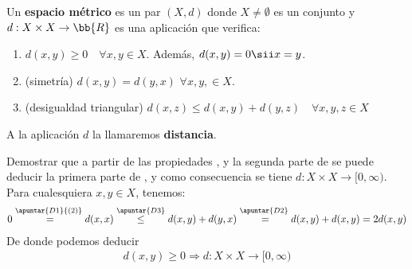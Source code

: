 \begin{definicion}
    Un \textbf{espacio métrico} es un par $(X, d)$ donde $X \neq \emptyset$ es un conjunto y $d: X \times X \rightarrow \bb{R}$ es una aplicación que verifica:

    \begin{enumerate}
        \item [\objetivo{D1}] $d(x, y) \geq 0$\ \ $\forall x,y \in X$. Además, $d(x,y)= 0 \sii x=y$.
        \item [\objetivo{D2}] (simetría) $d(x,y)=d(y,x)$ $\forall x, y, \in X.$
        \item [\objetivo{D3}] (desigualdad triangular) $d(x,z) \leq d(x,y) + d(y,z)$\ \ $\forall x,y,z \in X$
    \end{enumerate}

    A la aplicación $d$ la llamaremos \textbf{distancia}.
    \endsquare
\end{definicion}

\begin{ejercicio}
    Demostrar que a partir de las propiedades ,  y la segunda parte de  se puede deducir la primera parte de , y como consecuencia se tiene $d:X \times X \rightarrow [0, \infty)$.\\

    Para cualesquiera $x,y \in X$, tenemos:
    \begin{gather*}
        0 \overset{\apuntar{D1}{(2)}}{\vphantom{\leq}=} d(x,x) \overset{\apuntar{D3}}{\leq} d(x,y) + d(y,x) \overset{\apuntar{D2}}{\vphantom{\leq}=} d(x,y) + d(x,y) = 2 d(x,y)
    \end{gather*}
    De donde podemos deducir
    \begin{gather*}
        d(x,y) \geq 0 \Rightarrow d:X \times X \rightarrow [0, \infty)
    \end{gather*}

    \endsquare
\end{ejercicio}

